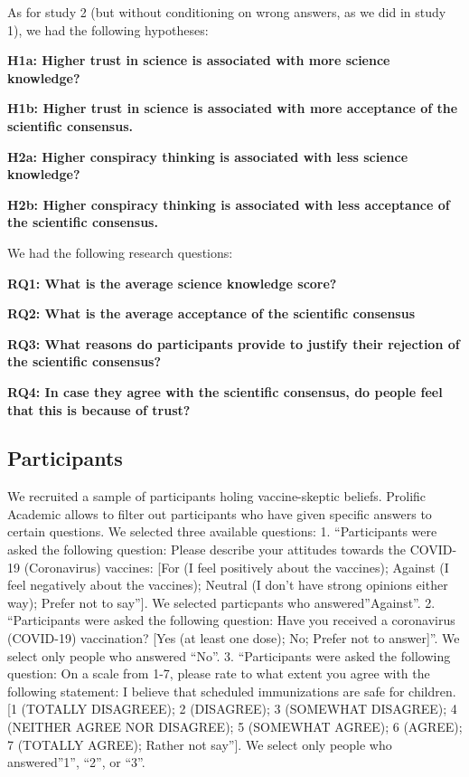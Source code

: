 \documentclass[
  doc,floatsintext]{apa6}
\begin{document}
As for study 2 (but without conditioning on wrong answers, as we did in study 1), we had the following hypotheses:

\textbf{H1a: Higher trust in science is associated with more science knowledge?}

\textbf{H1b: Higher trust in science is associated with more acceptance of the scientific consensus.}

\textbf{H2a: Higher conspiracy thinking is associated with less science knowledge?}

\textbf{H2b: Higher conspiracy thinking is associated with less acceptance of the scientific consensus.}

We had the following research questions:

\textbf{RQ1: What is the average science knowledge score?}

\textbf{RQ2: What is the average acceptance of the scientific consensus}

\textbf{RQ3: What reasons do participants provide to justify their rejection of the scientific consensus?}

\textbf{RQ4: In case they agree with the scientific consensus, do people feel that this is because of trust?}

\subsection{Participants}\label{participants-3}

We recruited a sample of participants holing vaccine-skeptic beliefs. Prolific Academic allows to filter out participants who have given specific answers to certain questions. We selected three available questions: 1. ``Participants were asked the following question: Please describe your attitudes towards the COVID-19 (Coronavirus) vaccines: {[}For (I feel positively about the vaccines); Against (I feel negatively about the vaccines); Neutral (I don't have strong opinions either way); Prefer not to say''{]}. We selected particpants who answered''Against''. 2. ``Participants were asked the following question: Have you received a coronavirus (COVID-19) vaccination? {[}Yes (at least one dose); No; Prefer not to answer{]}''. We select only people who answered ``No''. 3. ``Participants were asked the following question: On a scale from 1-7, please rate to what extent you agree with the following statement: I believe that scheduled immunizations are safe for children. {[}1 (TOTALLY DISAGREEE); 2 (DISAGREE); 3 (SOMEWHAT DISAGREE); 4 (NEITHER AGREE NOR DISAGREE); 5 (SOMEWHAT AGREE); 6 (AGREE); 7 (TOTALLY AGREE); Rather not say''{]}. We select only people who answered''1'', ``2'', or ``3''.
\end{document}
